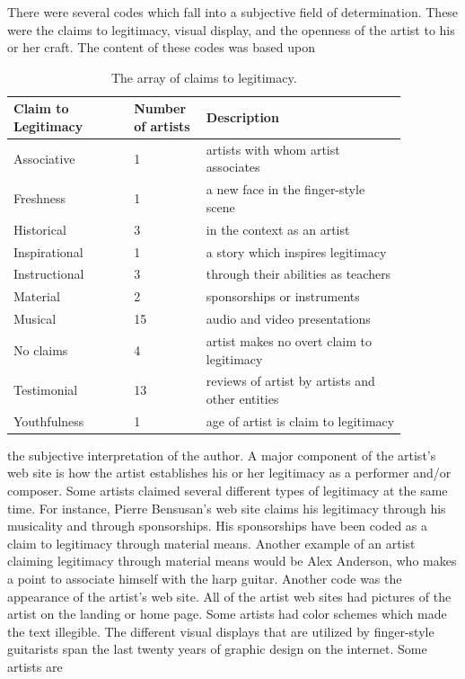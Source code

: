\documentclass[unicode,hyperfootnotes=false,xetex,colorlinks=true,nofonts,nobib]{tufte-handout}
\begin{document}
There were several codes which fall into a subjective field of
determination. These were the claims to legitimacy, visual display,
and the openness of the artist to his or her craft. The content of
these codes was based upon
\begin{table}
  \centering
  \small
  \begin{tabular}{p{0.27\linewidth}p{0.15\linewidth}p{0.45\linewidth}}\toprule
    Claim to Legitimacy & Number of artists & Description \\\midrule
    Associative & 1 & artists with whom artist associates \\
    Freshness & 1 & a new face in the finger-style scene \\
    Historical & 3 & in the context as an artist \\
    Inspirational & 1 & a story which inspires legitimacy \\
    Instructional & 3 & through their abilities as teachers \\
    Material & 2 & sponsorships or instruments \\
    Musical & 15 & audio and video presentations \\
    No claims & 4 & artist makes no overt claim to legitimacy \\
    Testimonial & 13 & reviews of artist by artists and other entities \\
    Youthfulness & 1 & age of artist is claim to legitimacy \\
      \bottomrule
  \end{tabular}
  \caption{The array of claims to legitimacy.}
\end{table}
the subjective interpretation of the author. A major component of the
artist's web site is how the artist establishes his or her legitimacy
as a performer and/or composer. Some artists claimed several different
types of legitimacy at the same time. For instance, Pierre Bensusan's
web site claims his legitimacy through his musicality and through
sponsorships. His sponsorships have been coded as a claim to
legitimacy through material means. Another example of an artist
claiming legitimacy through material means would be Alex Anderson, who
makes a point to associate himself with the harp guitar. Another code
was the appearance of the artist's web site. All of the artist web
sites had pictures of the artist on the landing or home page. Some
artists had color schemes which made the text illegible. The different
visual displays that are utilized by finger-style guitarists span the
last twenty years of graphic design on the internet. Some artists are
\end{document}
